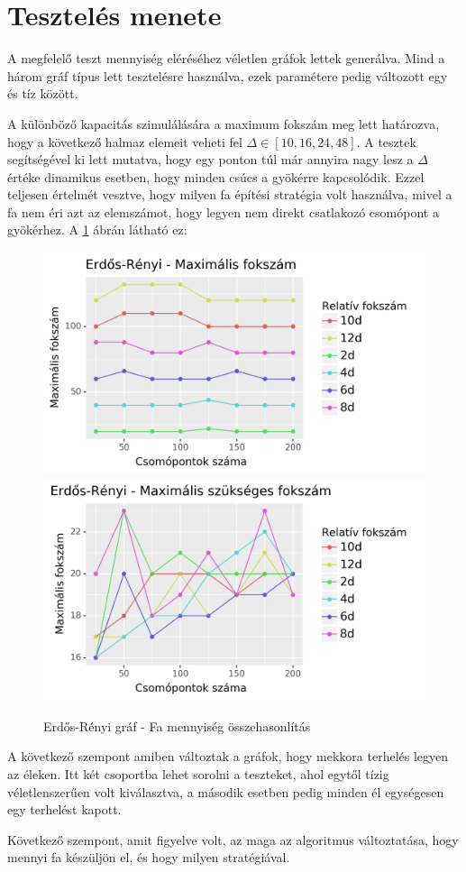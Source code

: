 \documentclass[12pt]{report}
\begin{document}
\section{Tesztelés menete}

A megfelelő teszt mennyiség eléréséhez véletlen gráfok lettek generálva. 
Mind a három gráf típus lett tesztelésre használva, ezek paramétere pedig változott egy és tíz között.

A különböző kapacitás szimulálására a maximum fokszám meg lett határozva, hogy a 
következő halmaz elemeit veheti fel $\Delta\in[10, 16, 24, 48]$.
A tesztek segítségével ki lett mutatva, hogy egy ponton túl már annyira nagy lesz a $\Delta$ értéke dinamikus esetben, hogy minden csúcs a gyökérre kapcsolódik.
Ezzel teljesen értelmét vesztve, hogy milyen fa építési stratégia volt használva, mivel a fa nem éri azt az elemszámot, hogy legyen nem direkt csatlakozó csomópont a gyökérhez. 
A \ref{delta} ábrán látható ez:  

\begin{figure}[H]
	\begin{center}
		\includegraphics[width=0.49\linewidth]{pictures/delta_max.png}
		\includegraphics[width=0.49\linewidth]{pictures/delta_req.png}
		\caption{Erdős-Rényi gráf - Fa mennyiség összehasonlítás}
		\label{delta}
	\end{center}
\end{figure}

A következő szempont amiben változtak a gráfok, hogy mekkora terhelés legyen az éleken.
Itt két csoportba lehet sorolni a teszteket, ahol egytől tízig véletlenszerűen volt kiválasztva, a második esetben pedig minden él egységesen egy terhelést kapott.

Következő szempont, amit figyelve volt, az maga az algoritmus változtatása, hogy mennyi fa készüljön el, és hogy milyen stratégiával.
\end{document}
